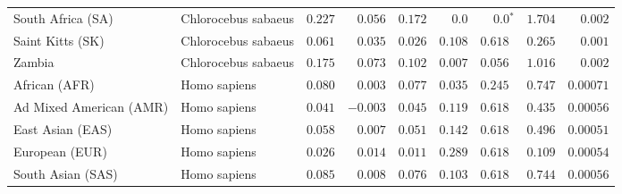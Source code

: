 \begin{center}
\begin{adjustbox}{width = 1\textwidth}
\begin{tabular}{|l|l|r|r|r|r|r|r|r|}
              South Africa (SA) &  Chlorocebus sabaeus &                                        $ 0.227$ &                                           $ 0.056$ &                      $ 0.172$ &            $0.0$ &                  $\bm{0.0{^*}}$ &                                           $ 1.704$ &           $ 0.002$ \\
               Saint Kitts (SK) &  Chlorocebus sabaeus &                                        $ 0.061$ &                                           $ 0.035$ &                      $ 0.026$ &         $ 0.108$ &                      $ 0.618~~$ &                                           $ 0.265$ &           $ 0.001$ \\
                         Zambia &  Chlorocebus sabaeus &                                        $ 0.175$ &                                           $ 0.073$ &                      $ 0.102$ &         $ 0.007$ &                      $ 0.056~~$ &                                           $ 1.016$ &           $ 0.002$ \\
                  African (AFR) &         Homo sapiens &                                        $ 0.080$ &                                           $ 0.003$ &                      $ 0.077$ &         $ 0.035$ &                      $ 0.245~~$ &                                           $ 0.747$ &          $0.00071$ \\
        Ad Mixed American (AMR) &         Homo sapiens &                                        $ 0.041$ &                                           $-0.003$ &                      $ 0.045$ &         $ 0.119$ &                      $ 0.618~~$ &                                           $ 0.435$ &          $0.00056$ \\
               East Asian (EAS) &         Homo sapiens &                                        $ 0.058$ &                                           $ 0.007$ &                      $ 0.051$ &         $ 0.142$ &                      $ 0.618~~$ &                                           $ 0.496$ &          $0.00051$ \\
                 European (EUR) &         Homo sapiens &                                        $ 0.026$ &                                           $ 0.014$ &                      $ 0.011$ &         $ 0.289$ &                      $ 0.618~~$ &                                           $ 0.109$ &          $0.00054$ \\
              South Asian (SAS) &         Homo sapiens &                                        $ 0.085$ &                                           $ 0.008$ &                      $ 0.076$ &         $ 0.103$ &                      $ 0.618~~$ &                                           $ 0.744$ &          $0.00056$ \\
\bottomrule
\end{tabular}
\end{adjustbox}
\newpage
\end{center}
